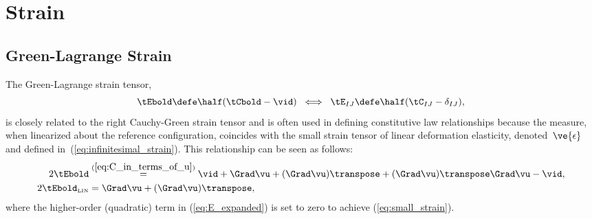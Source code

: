 \chapter{Strain}





\section{Green-Lagrange Strain}
The Green-Lagrange strain tensor,
\begin{equation}
 \tEbold 
 \defe
 \half (\tCbold - \vid)
 \;\; \Longleftrightarrow \;\;
 \tE_{IJ} 
 \defe 
 \half(\tC_{IJ} - \delta_{IJ}),
\end{equation}
is closely related to the right Cauchy-Green strain tensor
and is often used in defining constitutive
law relationships because the measure, when linearized
about the reference configuration, coincides with the
small strain tensor of linear deformation elasticity, 
denoted~$\ve{\epsilon}$ and defined 
in~(\ref{eq:infinitesimal_strain}).
This relationship can be seen as follows:
\begin{align}
 2 \tEbold 
     &\overset{(\ref{eq:C_in_terms_of_u})}{=} 
     \vid + \Grad \vu + (\Grad \vu)\transpose + 
     (\Grad \vu)\transpose \Grad \vu 
     - \vid,
     \label{eq:E_expanded} \\
 2 \tEbold_{\tiny \mbox{LIN}}
     &= 
     \Grad \vu + (\Grad \vu)\transpose,
     \label{eq:small_strain}
\end{align}
where the higher-order (quadratic) term in (\ref{eq:E_expanded}) is set
to zero to achieve (\ref{eq:small_strain}).

